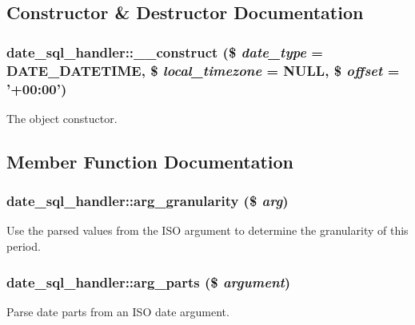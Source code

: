 \subsection{Constructor \& Destructor Documentation}
\hypertarget{classdate__sql__handler_adcee5f97d8e796260dc0048e9ed2d24e}{
\subsubsection[{\_\-\_\-construct}]{\setlength{\rightskip}{0pt plus 5cm}date\_\-sql\_\-handler::\_\-\_\-construct (\$ {\em date\_\-type} = {\ttfamily DATE\_\-DATETIME}, \/  \$ {\em local\_\-timezone} = {\ttfamily NULL}, \/  \$ {\em offset} = {\ttfamily '+00:00'})}}
\label{classdate__sql__handler_adcee5f97d8e796260dc0048e9ed2d24e}
The object constuctor. 

\subsection{Member Function Documentation}
\hypertarget{classdate__sql__handler_a4e05688eeafa5d0c9f2435d13a0bb2c2}{
\subsubsection[{arg\_\-granularity}]{\setlength{\rightskip}{0pt plus 5cm}date\_\-sql\_\-handler::arg\_\-granularity (\$ {\em arg})}}
\label{classdate__sql__handler_a4e05688eeafa5d0c9f2435d13a0bb2c2}
Use the parsed values from the ISO argument to determine the granularity of this period. \hypertarget{classdate__sql__handler_a128dc221ac52eea10f324d94b2b73301}{
\subsubsection[{arg\_\-parts}]{\setlength{\rightskip}{0pt plus 5cm}date\_\-sql\_\-handler::arg\_\-parts (\$ {\em argument})}}
\label{classdate__sql__handler_a128dc221ac52eea10f324d94b2b73301}
Parse date parts from an ISO date argument.

